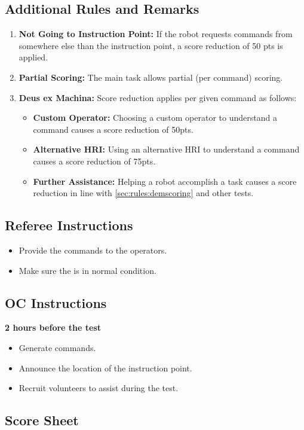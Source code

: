 %
%
\subsection*{Additional Rules and Remarks}
\begin{enumerate}[nosep]
	\item \textbf{Not Going to Instruction Point:} If the robot requests commands from somewhere else than the instruction point, a score reduction of 50 pts is applied.
	
	\item \textbf{Partial Scoring:} The main task allows partial (per command) scoring.
		
	\item \textbf{Deus ex Machina:} Score reduction applies per given command as follows:
	\begin{itemize}[nosep]
		\item \textbf{Custom Operator:} Choosing a custom operator to understand a command causes a score reduction of 50pts.
		\item \textbf{Alternative HRI:} Using an alternative HRI to understand a command causes a score reduction of 75pts.
		\item \textbf{Further Assistance:} Helping a robot accomplish a task causes a score reduction in line with \ref{sec:rules:demscoring} and other \SONE{} tests.
	\end{itemize}
\end{enumerate}

\newpage

\subsection*{Referee Instructions}
\begin{itemize}[nosep]
	\item Provide the commands to the operators.
	\item Make sure the \Arena{} is in normal condition.
\end{itemize}


\subsection*{OC Instructions}
\textbf{2 hours before the test}
\begin{itemize}[nosep]
 	\item Generate commands.
	\item Announce the location of the instruction point.
	\item Recruit volunteers to assist during the test.
\end{itemize}


\subsection*{Score Sheet}


